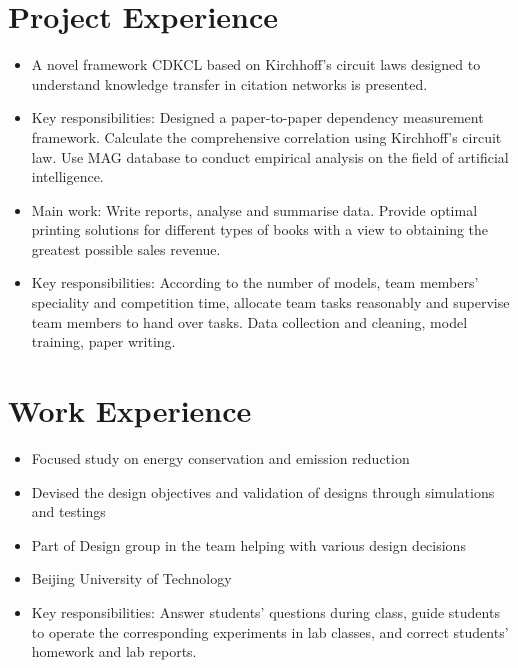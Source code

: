\documentclass{resume}
\begin{document}
\section{Project Experience}
\begin{itemize}
  \item A novel framework CDKCL based on Kirchhoff's circuit laws designed to understand knowledge transfer in citation networks is presented.
  \item Key responsibilities: Designed a paper-to-paper dependency measurement framework. Calculate the comprehensive correlation using Kirchhoff's circuit law. Use MAG database to conduct empirical analysis on the field of artificial intelligence.
\end{itemize}
\begin{itemize}
  \item Main work: Write reports, analyse and summarise data. Provide optimal printing solutions for different types of books with a view to obtaining the greatest possible sales revenue.
  \item Key responsibilities: According to the number of models, team members' speciality and competition time, allocate team tasks reasonably and supervise team members to hand over tasks. Data collection and cleaning, model training, paper writing.
\end{itemize}

\section{Work Experience}
\begin{itemize}
\item Focused study on energy conservation and emission reduction
\item Devised the design objectives and validation of designs through simulations and testings
\item Part of Design group in the team helping with various design decisions
\end{itemize}
\begin{itemize}
  \item Beijing University of Technology
  \item Key responsibilities: Answer students' questions during class, guide students to operate the corresponding experiments in lab classes, and correct students' homework and lab reports.
\end{itemize}
\end{document}
